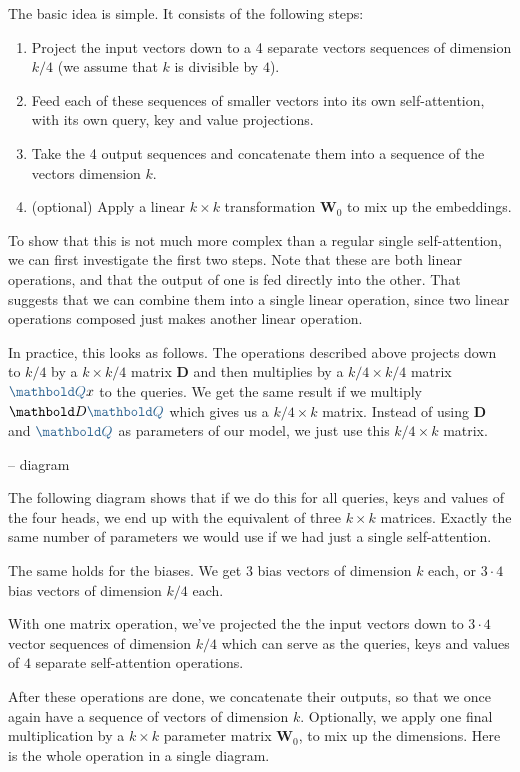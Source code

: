 \documentclass{pca}
\newenvironment{aside}{
	\setlength{\leftskip}{1em}\par\itshape
}{
	
	\setlength{\leftskip}{0em}\par
}
\newcommand{\bc}[1]{{\color{my-blue} #1}}
\newcommand{\mbD}{\mathbold D}
\newcommand{\mbQ}{\mathbold Q}
\newcommand{\mbW}{\mathbold W}
\theoremstyle{theorem}
\theoremstyle{definition}
\theoremstyle{proof}
\begin{document}
The basic idea is simple. It consists of the following steps:
\begin{enumerate}
	\item Project the input vectors down to a 4 separate vectors sequences of dimension $k/4$ (we assume that $k$ is divisible by $4$).
	\item Feed each of these sequences of smaller vectors into its own self-attention, with its own query, key and value projections. 
	\item Take the 4 output sequences and concatenate them into a sequence of the vectors dimension $k$.
	\item (optional) Apply a linear $k\times k$ transformation $\mbW_0$ to mix up the embeddings. 
\end{enumerate}

To show that this is not much more complex than a regular single self-attention, we can first investigate the first two steps. Note that these are both linear operations, and that the output of one is fed directly into the other. That suggests that we can combine them into a single linear operation, since two linear operations composed just makes another linear operation. 

In practice, this looks as follows. The operations described above projects down to $k/4$ by a  $k \times k/4$ matrix $\mbD$ and then multiplies by a 
$k/4 \times k/4$ matrix $\bc{\mbQ}x$ to the \bc{queries}. We get the same result if we multiply $\mbD\bc{\mbQ}$ which gives us a $k/4 \times k$ matrix. Instead of using $\mbD$ and $\bc{\mbQ}$ as parameters of our model, we just use this $k/4 \times k$ matrix. 

-- diagram

The following diagram shows that if we do this for all queries, keys and values of the four heads, we end up with the equivalent of three $k \times k$ matrices. Exactly the same number of parameters we would use if we had just a single self-attention. 

\begin{aside}
The same holds for the biases. We get 3 bias vectors of dimension $k$ each, or $3 \cdot 4$ bias vectors of dimension $k/4$ each.
\end{aside}
 
With one matrix operation, we've projected the the input vectors down to $3 \cdot 4$ vector sequences of dimension $k/4$ which can serve as the queries, keys and values of $4$ separate self-attention operations. 

After these operations are done, we concatenate their outputs, so that we once again have a sequence of vectors of dimension $k$. Optionally, we apply one final multiplication by a $k \times k$ parameter matrix $\mbW_0$, to mix up the dimensions. Here is the whole operation in a single diagram.
\end{document}
